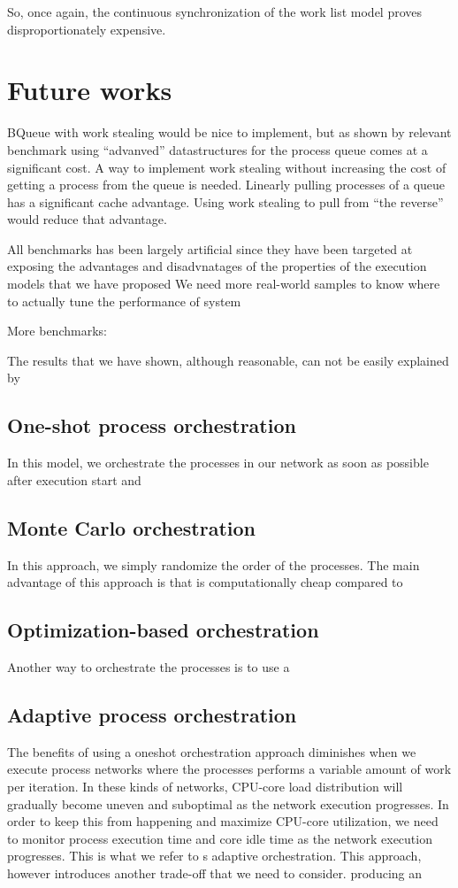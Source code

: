 So, once again, the continuous synchronization of the work list model
proves disproportionately expensive.

\section{Future works}

BQueue with work stealing would be nice to implement, but as shown by
relevant benchmark using ``advanved'' datastructures for the process
queue comes at a significant cost. A way to implement work stealing
without increasing the cost of getting a process from the queue is
needed. Linearly pulling processes of a queue has a significant cache
advantage. Using work stealing to pull from ``the reverse'' would
reduce that advantage. 

All benchmarks has been largely artificial since they have been
targeted at exposing the advantages and disadvnatages of the
properties of the execution models that we have proposed  We need more real-world
samples to know where to actually tune the performance of system

More benchmarks:


The results that we have shown, although reasonable, can not be easily
explained by

\subsection{One-shot process orchestration}
In this model, we orchestrate the processes in our network as soon as
possible after execution start and

\subsection{Monte Carlo orchestration}
In this approach, we simply randomize the order of the processes. The
main advantage of this approach is that is computationally cheap
compared to

\subsection{Optimization-based orchestration}
Another way to orchestrate the processes is to use a


\subsection{Adaptive process orchestration}
The benefits of using a oneshot orchestration approach diminishes when
we execute process networks where the processes performs a variable
amount of work per iteration. In these kinds of networks, CPU-core
load distribution will gradually become uneven and suboptimal as the
network execution progresses. In order to keep this from happening and
maximize CPU-core utilization, we need to monitor process execution
time and core idle time as the network execution progresses. This is
what we refer to s adaptive orchestration. This approach, however
introduces another trade-off that we need to consider. producing an

